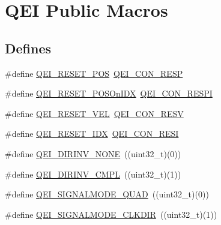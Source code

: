 \hypertarget{group___q_e_i___public___macros}{\section{\-Q\-E\-I \-Public \-Macros}
\label{group___q_e_i___public___macros}
}
\subsection*{\-Defines}
\begin{DoxyCompactItemize}
\item 
\#define \hyperlink{group___q_e_i___public___macros_ga46618c11a47e84f9353694c2d2274308}{\-Q\-E\-I\-\_\-\-R\-E\-S\-E\-T\-\_\-\-P\-O\-S}~\hyperlink{group___q_e_i___private___macros_gadab2ce38aa6d4b60258d5db13982e55c}{\-Q\-E\-I\-\_\-\-C\-O\-N\-\_\-\-R\-E\-S\-P}
\item 
\#define \hyperlink{group___q_e_i___public___macros_gadd624290baf76d310726cd93466ff9fe}{\-Q\-E\-I\-\_\-\-R\-E\-S\-E\-T\-\_\-\-P\-O\-S\-On\-I\-D\-X}~\hyperlink{group___q_e_i___private___macros_ga4d0c708b17d41cf80d5ea34777c1858f}{\-Q\-E\-I\-\_\-\-C\-O\-N\-\_\-\-R\-E\-S\-P\-I}
\item 
\#define \hyperlink{group___q_e_i___public___macros_ga2496eeda08d253f467206b75e3d636f9}{\-Q\-E\-I\-\_\-\-R\-E\-S\-E\-T\-\_\-\-V\-E\-L}~\hyperlink{group___q_e_i___private___macros_ga9f1eae1d8a4ba39f3197fdb69bcedc17}{\-Q\-E\-I\-\_\-\-C\-O\-N\-\_\-\-R\-E\-S\-V}
\item 
\#define \hyperlink{group___q_e_i___public___macros_ga89c2027b368cffe89ac1d2b5b4cce9bb}{\-Q\-E\-I\-\_\-\-R\-E\-S\-E\-T\-\_\-\-I\-D\-X}~\hyperlink{group___q_e_i___private___macros_ga76aa5b26274777d9606d79c697511c61}{\-Q\-E\-I\-\_\-\-C\-O\-N\-\_\-\-R\-E\-S\-I}
\item 
\#define \hyperlink{group___q_e_i___public___macros_gacac00295ded16c4578423bcb69a76f89}{\-Q\-E\-I\-\_\-\-D\-I\-R\-I\-N\-V\-\_\-\-N\-O\-N\-E}~((uint32\-\_\-t)(0))
\item 
\#define \hyperlink{group___q_e_i___public___macros_ga85f23a50dafe220e1cf061e457dd9601}{\-Q\-E\-I\-\_\-\-D\-I\-R\-I\-N\-V\-\_\-\-C\-M\-P\-L}~((uint32\-\_\-t)(1))
\item 
\#define \hyperlink{group___q_e_i___public___macros_ga434f1d60ddf4f3170544e7377e1df35b}{\-Q\-E\-I\-\_\-\-S\-I\-G\-N\-A\-L\-M\-O\-D\-E\-\_\-\-Q\-U\-A\-D}~((uint32\-\_\-t)(0))
\item 
\#define \hyperlink{group___q_e_i___public___macros_ga5f80e4de0e45cb320b7151abc417a818}{\-Q\-E\-I\-\_\-\-S\-I\-G\-N\-A\-L\-M\-O\-D\-E\-\_\-\-C\-L\-K\-D\-I\-R}~((uint32\-\_\-t)(1))

\end{DoxyCompactItemize}
